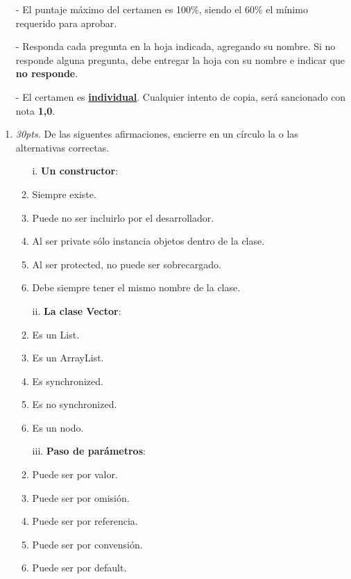 \documentclass[10pt]{article}
\begin{document}
	{\scriptsize
	\begin{itemize}
		\item[-] El puntaje m\'aximo del certamen es 100\%, siendo el 60\% el m\'inimo requerido para aprobar.
		\item[-] Responda cada pregunta en la hoja indicada, agregando su nombre. Si no responde alguna pregunta, debe entregar la hoja con su nombre e indicar que \textbf{no responde}.
		\item[-] El certamen es \underline{\textbf{individual}}. Cualquier intento de copia, ser\'a sancionado con nota \textbf{1,0}.
	\end{itemize}
	
	\vspace*{-20pt}

	\begin{enumerate}

		\item \emph{30pts.} De las siguentes afirmaciones, encierre en un c\'irculo la o las alternativas correctas.
		
		\begin{multicols}{2}

			\begin{enumerate}[label=(\alph*)]
				\item[i.] \textbf{Un constructor}:
				\item Siempre existe.
				\item Puede no ser incluirlo por el desarrollador.
				\item Al ser private s\'olo instancia objetos dentro de la clase.
				\item Al ser protected, no puede ser sobrecargado.
				\item Debe siempre tener el mismo nombre de la clase.
			\end{enumerate}

			\begin{enumerate}[label=(\alph*)]
				\item[ii.] \textbf{La clase Vector}:
				\item Es un List.
				\item Es un ArrayList.
				\item Es synchronized.
				\item Es no synchronized.
				\item Es un nodo.
			\end{enumerate}

			\begin{enumerate}[label=(\alph*)]
				\item[iii.] \textbf{Paso de par\'ametros}:
				\item Puede ser por valor.
				\item Puede ser por omisi\'on.
				\item Puede ser por referencia.
				\item Puede ser por convensi\'on.
				\item Puede ser por default.
			\end{enumerate}


\end{multicols}
\end{enumerate}}
\end{document}

